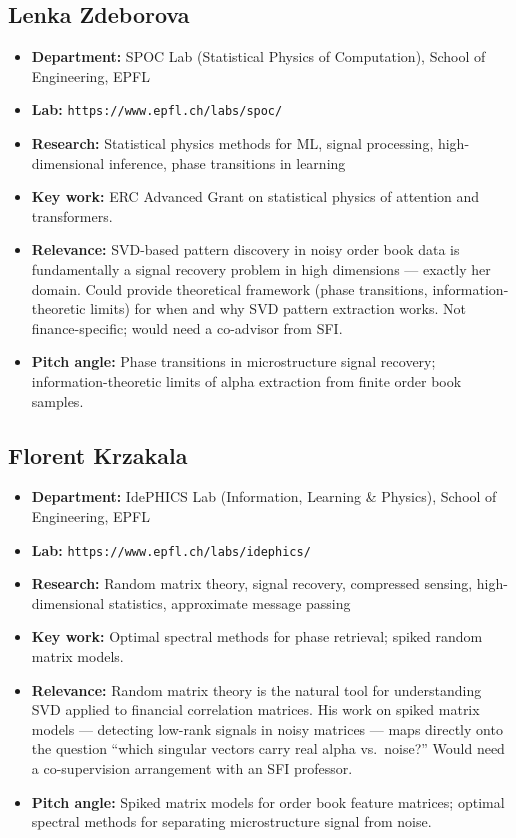 \documentclass[11pt,a4paper]{article}
\newcommand{\url}[1]{\texttt{#1}}
\begin{document}
\subsection{Lenka Zdeborova}
\begin{itemize}
  \item \textbf{Department:} SPOC Lab (Statistical Physics of Computation), School of Engineering, EPFL
  \item \textbf{Lab:} \url{https://www.epfl.ch/labs/spoc/}
  \item \textbf{Research:} Statistical physics methods for ML, signal processing, high-dimensional inference, phase transitions in learning
  \item \textbf{Key work:} ERC Advanced Grant on statistical physics of attention and transformers.
  \item \textbf{Relevance:} SVD-based pattern discovery in noisy order book data is fundamentally a signal recovery problem in high dimensions --- exactly her domain. Could provide theoretical framework (phase transitions, information-theoretic limits) for when and why SVD pattern extraction works. Not finance-specific; would need a co-advisor from SFI.
  \item \textbf{Pitch angle:} Phase transitions in microstructure signal recovery; information-theoretic limits of alpha extraction from finite order book samples.
\end{itemize}

\subsection{Florent Krzakala}
\begin{itemize}
  \item \textbf{Department:} IdePHICS Lab (Information, Learning \& Physics), School of Engineering, EPFL
  \item \textbf{Lab:} \url{https://www.epfl.ch/labs/idephics/}
  \item \textbf{Research:} Random matrix theory, signal recovery, compressed sensing, high-dimensional statistics, approximate message passing
  \item \textbf{Key work:} Optimal spectral methods for phase retrieval; spiked random matrix models.
  \item \textbf{Relevance:} Random matrix theory is the natural tool for understanding SVD applied to financial correlation matrices. His work on spiked matrix models --- detecting low-rank signals in noisy matrices --- maps directly onto the question ``which singular vectors carry real alpha vs.\ noise?'' Would need a co-supervision arrangement with an SFI professor.
  \item \textbf{Pitch angle:} Spiked matrix models for order book feature matrices; optimal spectral methods for separating microstructure signal from noise.
\end{itemize}
\end{document}
